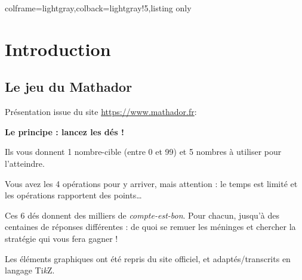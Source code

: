 \documentclass[11pt,a4paper]{ltxdoc}
\providecommand\tikzlogo{Ti\textit{k}Z}
\let\TikZ\tikzlogo
\begin{document}
\begin{tcblisting}{colframe=lightgray,colback=lightgray!5,listing only}
\end{tcblisting}

\begin{tcolorbox}[colframe=lightgray,colback=lightgray!5]
\hfill{}\hfill\null
\end{tcolorbox}

\vfill\null

\pagebreak


\hypertarget{matoc}{}

\tableofcontents

\vspace*{5mm}


\pagebreak

\section{Introduction}

\subsection{Le jeu du Mathador}

Présentation issue du site \url{https://www.mathador.fr}:

\begin{tcolorbox}[enhanced,colback=orange!15,colframe=orange!75!black,fontupper=\small\itshape\sffamily,width=0.75\linewidth,center,watermark opacity=0.1,watermark zoom=0.95,watermark graphics={mathadorlogo.pdf}]
\textbf{Le principe : lancez les dés !}

Ils vous donnent 1 nombre-cible (entre 0 et 99) et 5 nombres à utiliser pour l'atteindre.

Vous avez les 4 opérations pour y arriver, mais attention : le temps est limité et les opérations rapportent des points\ldots

Ces 6 dés donnent des milliers de \textit{compte-est-bon}. Pour chacun, jusqu'à des centaines de réponses différentes : de quoi se remuer les méninges et chercher la stratégie qui vous fera gagner !
\end{tcolorbox}

Les éléments graphiques ont été repris du site officiel, et adaptés/transcrits en langage \TikZ.
\end{document}
